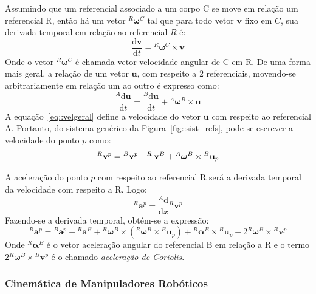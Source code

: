 Assumindo que um referencial associado a um corpo C se move em relação
um referencial R, então há um vetor $^{R}\boldsymbol{\omega}^{C}$ tal que para
todo vetor $\mathbf{v}$ fixo em $C$, sua derivada temporal em relação ao
referencial $R$ é:
%
\begin{equation}
	\frac{\mathrm{d} \mathbf{v}}{\mathrm{d} t} = {}^{R}\boldsymbol{\omega}^{C}
	\times \mathbf{v}
\end{equation}
%
Onde o vetor ${}^{R}\boldsymbol{\omega}^{C}$ é chamada vetor velocidade angular
de C em R.
De uma forma mais geral, a relação de um vetor $\mathbf{u}$, com respeito a 2
referenciais, movendo-se arbitrariamente em relação um ao outro é expresso como:
%
\begin{equation} \label{eq::velgeral}
	\frac{^{A}\mathrm{d} \mathbf{u}}{\mathrm{d} t} = \frac{^{B}\mathrm{d}
	\mathbf{u}}{\mathrm{d} t} + {}^{A}\boldsymbol{\omega}^{B} \times \mathbf{u}
\end{equation}
%
A equação~\ref{eq::velgeral} define a velocidade do vetor $\mathbf{u}$ com
respeito ao referencial A. Portanto, do sistema genérico da
Figura~\ref{fig::sist_refs}, pode-se escrever a velocidade do ponto $p$ como:
%
\begin{equation}
	^{R}\mathbf{v}^{p} = {}^{B}\mathbf{v}^{p} + ^{R}\mathbf{v}^{B} +
	{}^{A}\boldsymbol{\omega}^{B} \times {}^{B}\textrm{\textbf{u}}_{p}
\end{equation}
%

A aceleração do ponto $p$ com respeito ao referencial R será a derivada temporal
da velocidade com respeito a R. Logo:
%
\begin{equation}
	^{R}\mathbf{a}^{p} = \frac{^{A}\mathrm{d} }{\mathrm{d} x} {^{R}\mathbf{v}^{p}}
\end{equation}
%
Fazendo-se a derivada temporal, obtém-se a expressão:
%
\begin{equation}
	^{R}\mathbf{a}^{p} = {}^{B}\mathbf{a}^{p} + {}^{R}\mathbf{a}^{B} +
	{}^{R}\boldsymbol{\omega}^{B} \times ({}^{R}\boldsymbol{\omega}^{B} \times
	{}^{B}\mathbf{u}_p) + {}^{R}\boldsymbol{\alpha}^{B} \times {}^{B}\mathbf{u}_p
	+ 2{}^{R}\boldsymbol{\omega}^{B} \times {}^{B}\mathbf{v}^{p}
\end{equation}
%
Onde ${}^{R}\boldsymbol{\alpha}^{B}$ é o vetor aceleração angular do referencial
B em relação a R e o termo $2{}^{R}\boldsymbol{\omega}^{B} \times
{}^{B}\mathbf{v}^{p}$ é o chamado \emph{aceleração de Coriolis}. 


\subsubsection{Cinemática de Manipuladores Robóticos}

